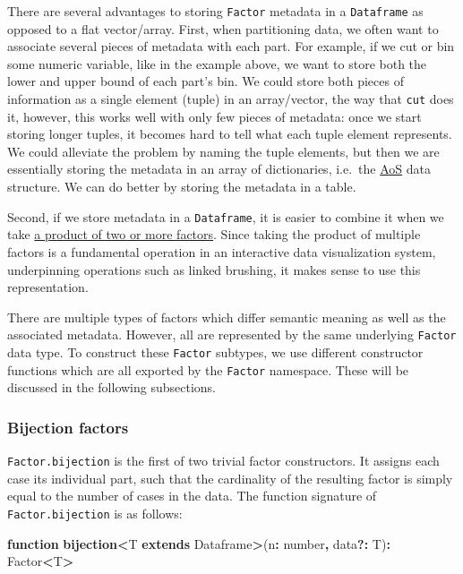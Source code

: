 \documentclass[
]{book}
\newenvironment{Shaded}{\begin{snugshade}}{\end{snugshade}}
\newcommand{\DataTypeTok}[1]{\textcolor[rgb]{0.13,0.29,0.53}{#1}}
\newcommand{\FunctionTok}[1]{\textcolor[rgb]{0.13,0.29,0.53}{\textbf{#1}}}
\newcommand{\KeywordTok}[1]{\textcolor[rgb]{0.13,0.29,0.53}{\textbf{#1}}}
\newcommand{\NormalTok}[1]{#1}
\newcommand{\OperatorTok}[1]{\textcolor[rgb]{0.81,0.36,0.00}{\textbf{#1}}}
\theoremstyle{definition}
\theoremstyle{definition}
\theoremstyle{definition}
\theoremstyle{definition}
\theoremstyle{remark}
\begin{document}
There are several advantages to storing \texttt{Factor} metadata in a \texttt{Dataframe} as opposed to a flat vector/array. First, when partitioning data, we often want to associate several pieces of metadata with each part. For example, if we cut or bin some numeric variable, like in the example above, we want to store both the lower and upper bound of each part's bin. We could store both pieces of information as a single element (tuple) in an array/vector, the way that \texttt{cut} does it, however, this works well with only few pieces of metadata: once we start storing longer tuples, it becomes hard to tell what each tuple element represents. We could alleviate the problem by naming the tuple elements, but then we are essentially storing the metadata in an array of dictionaries, i.e.~the \hyperref[SoA]{AoS} data structure. We can do better by storing the metadata in a table.

Second, if we store metadata in a \texttt{Dataframe}, it is easier to combine it when we take \hyperref[Productux5cux2520factors]{a product of two or more factors}. Since taking the product of multiple factors is a fundamental operation in an interactive data visualization system, underpinning operations such as linked brushing, it makes sense to use this representation.

There are multiple types of factors which differ semantic meaning as well as the associated metadata. However, all are represented by the same underlying \texttt{Factor} data type. To construct these \texttt{Factor} subtypes, we use different constructor functions which are all exported by the \texttt{Factor} namespace. These will be discussed in the following subsections.

\subsubsection{Bijection factors}\label{bijection-factors}

\texttt{Factor.bijection} is the first of two trivial factor constructors. It assigns each case its individual part, such that the cardinality of the resulting factor is simply equal to the number of cases in the data. The function signature of \texttt{Factor.bijection} is as follows:

\begin{Shaded}
\begin{Highlighting}[]
\KeywordTok{function} \FunctionTok{bijection}\OperatorTok{\textless{}}\NormalTok{T }\KeywordTok{extends}\NormalTok{ Dataframe}\OperatorTok{\textgreater{}}\NormalTok{(n}\OperatorTok{:} \DataTypeTok{number}\OperatorTok{,}\NormalTok{ data}\OperatorTok{?:}\NormalTok{ T)}\OperatorTok{:}\NormalTok{ Factor}\OperatorTok{\textless{}}\NormalTok{T}\OperatorTok{\textgreater{}} 
\end{Highlighting}
\end{Shaded}
\end{document}
